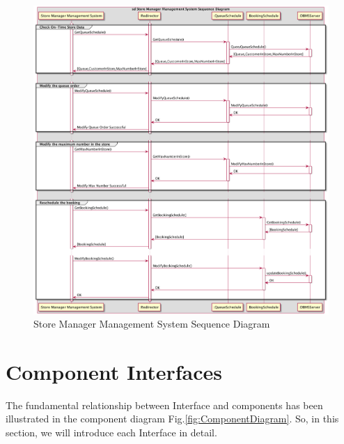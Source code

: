 \documentclass[a4paper,12pt]{report}
\begin{document}
\begin{figure}[H]
	\includegraphics[width=1.2\textwidth]{sequence_diagram_StoreManagerManagementSystem}
	\centering
	\caption{Store Manager Management System Sequence Diagram}
	\label{fig:StoreManagerManagementSystemSequenceDiagram}
\end{figure}


\section{Component Interfaces}\label{sec:component-interfaces}

The fundamental relationship between Interface and components has been illustrated in the component diagram Fig.\ref{fig:ComponentDiagram}.
So, in this section, we will introduce each Interface in detail.

\vspace{5mm}
\end{document}

